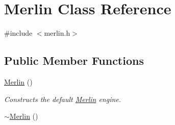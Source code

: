 \hypertarget{classMerlin}{}\section{Merlin Class Reference}
\label{classMerlin}


{\ttfamily \#include $<$merlin.\+h$>$}

\subsection*{Public Member Functions}
\begin{DoxyCompactItemize}
\item 
\hyperlink{classMerlin_af65be93499637052ab723eebb3bf4508}{Merlin} ()\hypertarget{classMerlin_af65be93499637052ab723eebb3bf4508}{}\label{classMerlin_af65be93499637052ab723eebb3bf4508}

\begin{DoxyCompactList}\small\item\em Constructs the default \hyperlink{classMerlin}{Merlin} engine. \end{DoxyCompactList}\item 
\hyperlink{classMerlin_a12e78669d769bd7540fd1ef272151cb1}{$\sim$\+Merlin} ()\hypertarget{classMerlin_a12e78669d769bd7540fd1ef272151cb1}{}\label{classMerlin_a12e78669d769bd7540fd1ef272151cb1}


\end{DoxyCompactItemize}
